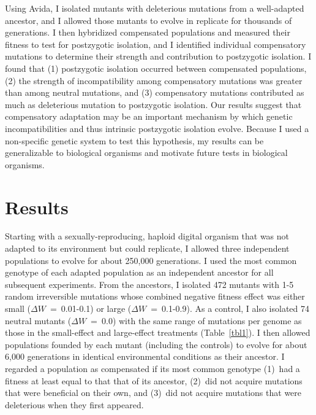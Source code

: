 \begin{doublespace}
Using Avida, I isolated mutants with deleterious mutations
from a well-adapted ancestor, and I allowed those mutants to evolve
in replicate for thousands of generations.
%
I then hybridized compensated populations and measured their fitness
to test for postzygotic isolation,
and I identified individual compensatory mutations to determine
their strength and contribution to postzygotic isolation.
%
I found that (1) postzygotic isolation occurred between compensated populations,
(2) the strength of incompatibility among compensatory mutations
was greater than among neutral mutations, and
(3) compensatory mutations contributed as much as deleterious mutation
to postzygotic isolation.
%
Our results suggest that compensatory adaptation may be an important
mechanism by which genetic incompatibilities and
thus intrinsic postzygotic isolation evolve.
%
Because I used a non-specific genetic system to test this hypothesis,
my results can be generalizable to biological organisms and motivate
future tests in biological organisms.



\section{Results}

Starting with a sexually-reproducing, haploid digital organism
that was not adapted to its environment but could replicate,
I allowed three independent populations to evolve
for about 250,000 generations.
%
I used the most common genotype of each adapted population
as an independent ancestor for all subsequent experiments.
%
From the ancestors, I isolated 472 mutants
with 1-5 random irreversible mutations
whose combined negative fitness effect was either
small ($\Delta W$~=~0.01-0.1) or large ($\Delta W$~=~0.1-0.9).
%
As a control, I also isolated 74 neutral mutants ($\Delta W$~=~0.0)
with the same range of mutations per genome as those
in the small-effect and large-effect treatments (Table~\ref{tbl1}).
%
I then allowed populations founded by each mutant (including the controls)
to evolve for about 6,000 generations
in identical environmental conditions as their ancestor.
%
I regarded a population as compensated if its most common genotype
(1)~had a fitness at least equal to that that of its ancestor,
(2)~did not acquire mutations that were beneficial on their own, and
(3)~did not acquire mutations that were deleterious when they first appeared.




\end{doublespace}
